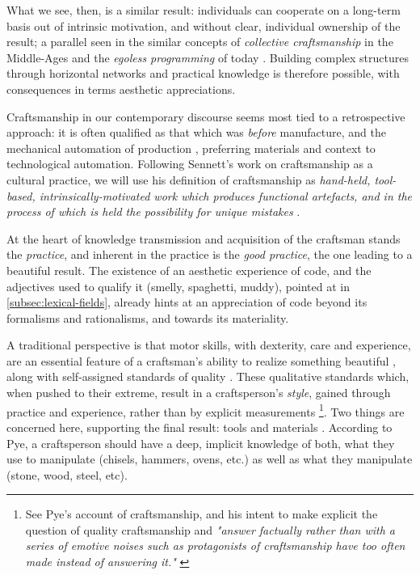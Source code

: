 What we see, then, is a similar result: individuals can cooperate on a long-term basis out of intrinsic motivation, and without clear, individual ownership of the result; a parallel seen in the similar concepts of \emph{collective craftsmanship} in the Middle-Ages and the \emph{egoless programming} of today \citep{brooksjr_mythical_1975}. Building complex structures through horizontal networks and practical knowledge is therefore possible, with consequences in terms aesthetic appreciations.

Craftsmanship in our contemporary discourse seems most tied to a retrospective approach: it is often qualified as that which was \emph{before} manufacture, and the mechanical automation of production \citep{thompson_study_1934}, preferring materials and context to technological automation. Following Sennett's work on craftsmanship as a cultural practice, we will use his definition of craftsmanship as \emph{hand-held, tool-based, intrinsically-motivated work which produces functional artefacts, and in the process of which is held the possibility for unique mistakes} \citep{sennett_craftsman_2009}.

At the heart of knowledge transmission and acquisition of the craftsman stands the \emph{practice}, and inherent in the practice is the \emph{good practice}, the one leading to a beautiful result. The existence of an aesthetic experience of code, and the adjectives used to qualify it (smelly, spaghetti, muddy), pointed at in \ref{subsec:lexical-fields}, already hints at an appreciation of code beyond its formalisms and rationalisms, and towards its materiality.

A traditional perspective is that motor skills, with dexterity, care and experience, are an essential feature of a craftsman's ability to realize something beautiful \citep{osborne_aesthetic_1977}, along with self-assigned standards of quality \citep{pye_nature_2008,sennett_craftsman_2009}. These qualitative standards which, when pushed to their extreme, result in a craftsperson's \emph{style}, gained through practice and experience, rather than by explicit measurements \citep{pye_nature_2008} \footnote{See Pye's account of craftsmanship, and his intent to make explicit the question of quality craftsmanship and \emph{"answer factually rather than with a series of emotive noises such as protagonists of craftsmanship have too often made instead of answering it."} \citep{pye_nature_2008}}. Two things are concerned here, supporting the final result: tools and materials \citep{pye_nature_2008}. According to Pye, a craftsperson should have a deep, implicit knowledge of both, what they use to manipulate (chisels, hammers, ovens, etc.) as well as what they manipulate (stone, wood, steel, etc).


